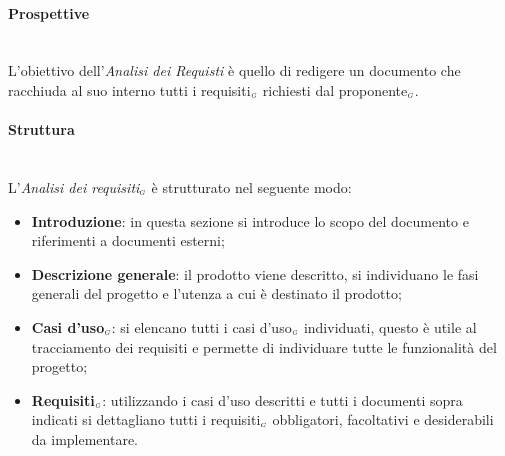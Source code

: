 \paragraph{Prospettive}\label{ProcessiPrimariProspettiveAnalisiDeiRequisitiProspettive}\mbox{}\\
L'obiettivo dell'\textit{Analisi dei Requisti} è quello di redigere un documento che racchiuda al suo interno tutti i requisiti$_{\scaleto{G}{3pt}}$ richiesti dal proponente$_{\scaleto{G}{3pt}}$.
\paragraph{Struttura}\label{ProcessiPrimariProspettiveAnalisiDeiRequisitiStruttura}\mbox{}\\ %
L'\textit{Analisi dei requisiti$_{\scaleto{G}{3pt}}$} è strutturato nel seguente modo:
\begin{itemize}
	\item \textbf{Introduzione}: in questa sezione si introduce lo scopo del documento e riferimenti a documenti esterni;
	\item \textbf{Descrizione generale}: il prodotto viene descritto, si individuano le fasi generali del progetto e l'utenza a cui è destinato il prodotto;
	\item \textbf{Casi d'uso$_{\scaleto{G}{3pt}}$}: si elencano tutti i casi d'uso$_{\scaleto{G}{3pt}}$ individuati, questo è utile al tracciamento dei requisiti e permette di individuare tutte le funzionalità del progetto;
	\item \textbf{Requisiti$_{\scaleto{G}{3pt}}$}: utilizzando i casi d'uso descritti e tutti i documenti sopra indicati si dettagliano tutti i requisiti$_{\scaleto{G}{3pt}}$ obbligatori, facoltativi e desiderabili da implementare.
\end{itemize}
